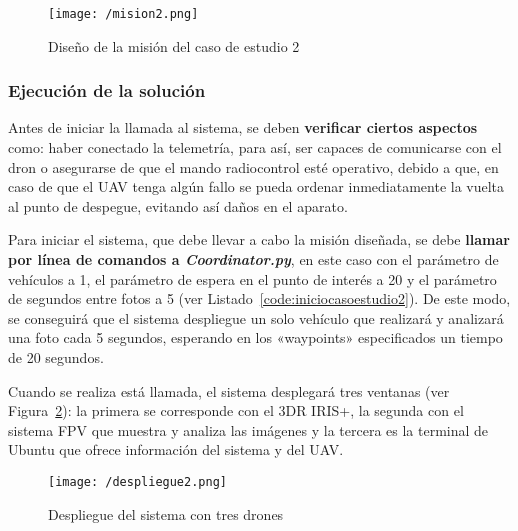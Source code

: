 \begin{figure}[!h]
\begin{center}
\texttt{[image: /mision2.png]}
\caption[Diseño de la misión del caso de estudio 2]{Diseño de la misión del caso de estudio 2}
\label{fig:mision2}
\end{center}
\end{figure}

\subsubsection{Ejecución de la solución}

Antes de iniciar la llamada al sistema, se deben \textbf{verificar ciertos aspectos} como: haber conectado la telemetría, para así, ser capaces de comunicarse con el dron o  asegurarse de que el mando radiocontrol esté operativo, debido a que, en caso de que el \acs{UAV} tenga algún fallo se pueda ordenar inmediatamente la vuelta al punto de despegue, evitando así daños en el aparato.

Para iniciar el sistema, que debe llevar a cabo la misión diseñada, se debe \textbf{llamar por línea de comandos a \textit{Coordinator.py}}, en este caso con el parámetro de vehículos a 1, el parámetro de espera en el punto de interés a 20 y el parámetro de segundos entre fotos a 5 (ver Listado~\ref{code:iniciocasoestudio2}). De este modo, se conseguirá que el sistema despliegue un solo vehículo que realizará y analizará una foto cada 5 segundos, esperando en los «waypoints» especificados un tiempo de 20 segundos.


\clearpage

Cuando se realiza está llamada, el sistema desplegará tres ventanas (ver Figura~\ref{fig:despliegue2}): la primera se corresponde con el 3DR IRIS+, la segunda con el sistema \acs{FPV} que muestra y analiza las imágenes y la tercera es la terminal de Ubuntu que ofrece información del sistema y del \acs{UAV}.

\begin{figure}[!h]
\begin{center}
\texttt{[image: /despliegue2.png]}
\caption[Despliegue del sistema con tres drones]{Despliegue del sistema con tres drones}
\label{fig:despliegue2}
\end{center}
\end{figure}

